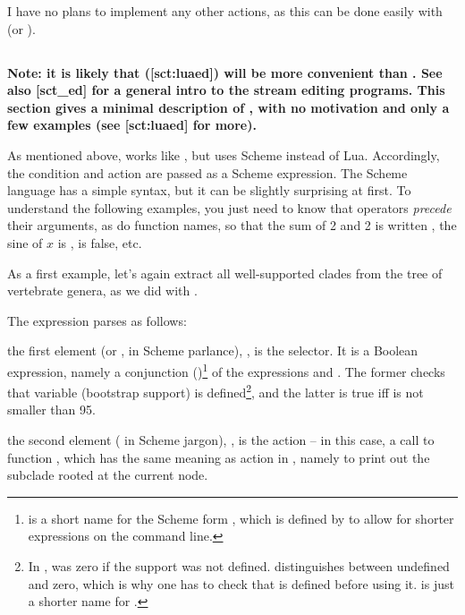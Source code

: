 I have no plans to implement any other actions, as this can be done easily
with \luaed{} (or \sched).

\subsection{\sched}

\bf{Note}: it is likely that \luaed{} (\in{}[sct:luaed]) will be more
convenient than \sched. See also [sct_ed] for a general intro to the
stream editing programs. This section gives a minimal description of \sched,
with no motivation and only a few examples (see \in{}[sct:luaed] for more).

As mentioned above, \sched{} works like \luaed{}, but uses Scheme
instead of Lua. Accordingly, the condition and action are passed as a Scheme
expression. The Scheme language has a simple syntax, but it can
be slightly surprising at first. To understand the following examples, you just
need to know that operators {\em precede} their arguments, as do function
names, so that the sum of 2 and 2 is written , the sine of $x$
is ,  is false, etc.

As a first example, let's again extract all
well-supported clades from the tree of vertebrate genera, as we did with \luaed.

\page[no]


The expression  parses as follows:
\startitemize
	\item the first element (or , in Scheme parlance),
	, is the selector.  It is a Boolean
	expression, namely a conjunction (\code{\&})\footnote{\code{\&} is
	a short name for the Scheme form , which is defined by
	\sched{} to allow for shorter expressions on the command line.} of the
	expressions  and .  The former
	checks that variable  (bootstrap support) is
	defined\footnote{In \ed,  was zero if the support was not
	defined. \sched{} distinguishes between undefined and zero, which is
	why one has to check that  is defined before using it.
	 is just a shorter name for .}, and the
	latter is true iff  is not smaller than 95.
	\item the second element ( in Scheme jargon),
	, is the action -- in this case, a call to function
	, which has the same meaning as action  in \ed,
	namely to print out the subclade rooted at the current node.
\stopitemize

